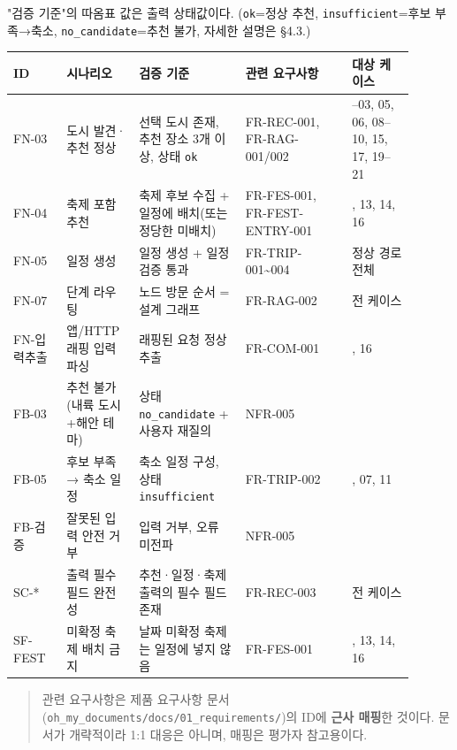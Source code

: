 \documentclass[11pt,a4paper]{article}
\begin{document}
"검증 기준"의 따옴표 값은 출력 상태값이다. (\texttt{ok}=정상 추천, \texttt{insufficient}=후보 부족→축소, \texttt{no\_\allowbreak{}candidate}=추천 불가, 자세한 설명은 §4.3.)

\begin{tiny}
\begin{longtable}{@{}>{\RaggedRight\arraybackslash}m{0.120\linewidth}>{\RaggedRight\arraybackslash}m{0.160\linewidth}>{\RaggedRight\arraybackslash}m{0.240\linewidth}>{\RaggedRight\arraybackslash}m{0.240\linewidth}>{\RaggedRight\arraybackslash}m{0.140\linewidth}@{}}
\toprule\noalign{}
ID & 시나리오 & 검증 기준 & 관련 요구사항 & 대상 케이스 \\
\midrule\noalign{}
\endhead
\bottomrule\noalign{}
\endlastfoot
FN-03 & 도시 발견·추천 정상 & 선택 도시 존재, 추천 장소 3개 이상, 상태 \texttt{ok} & FR-REC-001, FR-RAG-001/002 & 01--03, 05, 06, 08--10, 15, 17, 19--21 \\
FN-04 & 축제 포함 추천 & 축제 후보 수집 + 일정에 배치(또는 정당한 미배치) & FR-FES-001, FR-FEST-ENTRY-001 & 12, 13, 14, 16 \\
FN-05 & 일정 생성 & 일정 생성 + 일정 검증 통과 & FR-TRIP-001\textasciitilde004 & 정상 경로 전체 \\
FN-07 & 단계 라우팅 & 노드 방문 순서 = 설계 그래프 & FR-RAG-002 & 전 케이스 \\
FN-입력추출 & 앱/HTTP 래핑 입력 파싱 & 래핑된 요청 정상 추출 & FR-COM-001 & 15, 16 \\
FB-03 & 추천 불가(내륙 도시+해안 테마) & 상태 \texttt{no\_\allowbreak{}candidate} + 사용자 재질의 & NFR-005 & 22 \\
FB-05 & 후보 부족 → 축소 일정 & 축소 일정 구성, 상태 \texttt{insufficient} & FR-TRIP-002 & 04, 07, 11 \\
FB-검증 & 잘못된 입력 안전 거부 & 입력 거부, 오류 미전파 & NFR-005 & 18 \\
SC-* & 출력 필수 필드 완전성 & 추천·일정·축제 출력의 필수 필드 존재 & FR-REC-003 & 전 케이스 \\
SF-FEST & 미확정 축제 배치 금지 & 날짜 미확정 축제는 일정에 넣지 않음 & FR-FES-001 & 12, 13, 14, 16 \\
\end{longtable}
\end{tiny}

\begin{quote}
관련 요구사항은 제품 요구사항 문서(\texttt{oh\_\allowbreak{}my\_\allowbreak{}documents/\allowbreak{}docs/\allowbreak{}01\_\allowbreak{}requirements/\allowbreak{}})의 ID에 \textbf{근사 매핑}한 것이다. 문서가 개략적이라 1:1 대응은 아니며, 매핑은 평가자 참고용이다.
\end{quote}
\end{document}

